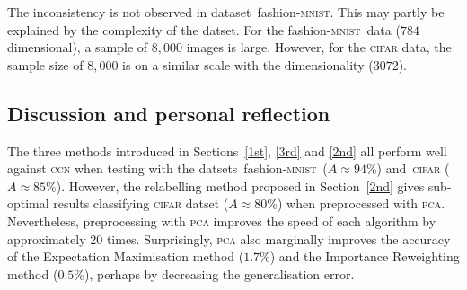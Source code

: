 \documentclass[12pt]{article} %
\newcommand{\mnist}{fashion-\textsc{mnist}}
\begin{document}
The inconsistency is not observed in dataset~\mnist. This may partly be explained by the complexity of the datset. For the \mnist\ data ($784$ dimensional), a sample of $8,000$ images is large. However, for the \textsc{cifar} data, the sample size of $8,000$ is on a similar scale with the dimensionality ($3072$).






\subsection{Discussion and personal reflection}




The three methods introduced in Sections~\ref{1st}, \ref{3rd} and \ref{2nd}  all perform well against \textsc{ccn} when testing with the datsets~\mnist\ ($A\approx 94\%$) and~\textsc{cifar} ($A\approx 85\%$). However, the relabelling method proposed in Section~\ref{2nd} gives sub-optimal  results classifying \textsc{cifar} datset ($A\approx 80\%$) when preprocessed with \textsc{pca}. Nevertheless, preprocessing with \textsc{pca} improves the speed of each algorithm by approximately 20 times. Surprisingly, \textsc{pca} also marginally improves the accuracy of the Expectation Maximisation method ($1.7\%$) and the Importance Reweighting method ($0.5\%$), perhaps by decreasing the generalisation error.
\end{document}
